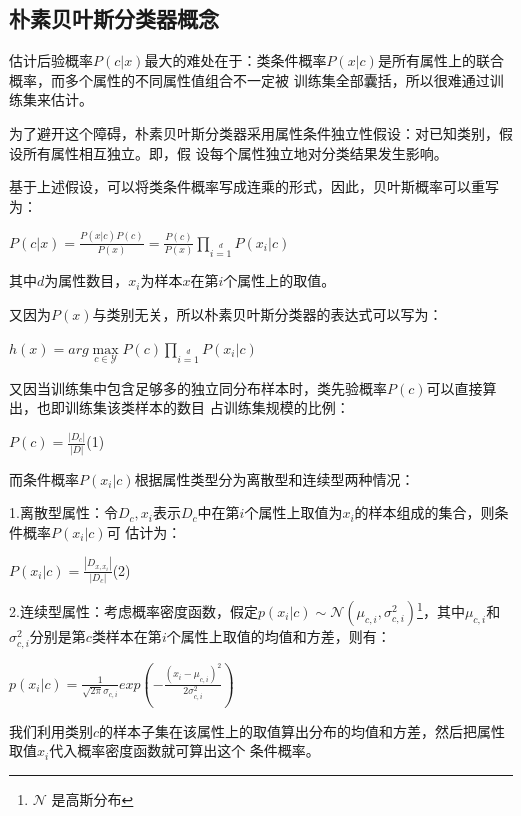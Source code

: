 \documentclass[UTF8]{ctexart}
\begin{document}
{\subsection{朴素贝叶斯分类器概念}
估计后验概率$P(c|x)$最大的难处在于：类条件概率$P(x|c)$是所有属性上的联合概率，而多个属性的不同属性值组合不一定被
训练集全部囊括，所以很难通过训练集来估计。\par
为了避开这个障碍，朴素贝叶斯分类器采用属性条件独立性假设：对已知类别，假设所有属性相互独立。即，假
设每个属性独立地对分类结果发生影响。\par
基于上述假设，可以将类条件概率写成连乘的形式，因此，贝叶斯概率可以重写为：
\begin{center}
    \LARGE{
        $P(c|x)=\frac{P(x|c)P(c)}{P(x)}=\frac{P(c)}{P(x)}\prod\limits_{i=1}\limits^dP(x_i|c)$
    }
\end{center}
其中$d$为属性数目，$x_i$为样本$x$在第$i$个属性上的取值。\par
又因为$P(x)$与类别无关，所以朴素贝叶斯分类器的表达式可以写为：
\begin{center}
    \LARGE{
        $h(x)=arg\max\limits_{c\in \mathcal Y}P(c)\prod\limits_{i=1}\limits^dP(x_i|c)$
    }
\end{center}\par
又因当训练集中包含足够多的独立同分布样本时，类先验概率$P(c)$可以直接算出，也即训练集该类样本的数目
占训练集规模的比例：
\begin{center}
    \LARGE{
        $P(c)=\frac{|D_c|}{|D|}$\quad(1)\\[2ex]
    }
\end{center}\par
而条件概率$P(x_i|c)$根据属性类型分为离散型和连续型两种情况：\par
1.离散型属性：令$D_c,x_i$表示$D_c$中在第$i$个属性上取值为$x_i$的样本组成的集合，则条件概率$P(x_i|c)$可
估计为：
\begin{center}
    \LARGE{
        $P(x_i|c)=\frac{|D_{x,x_i}|}{|D_c|}$\quad(2)\\[2ex]
    }
\end{center}\par
2.连续型属性：考虑概率密度函数，假定$p(x_i|c)\sim\mathcal N(\mu_{c,i},\sigma^2_{c,i})$\footnote{$\mathcal N$
是高斯分布}，其中$\mu_{c,i}$和$\sigma^2_{c,i}$分别是第$c$类样本在第$i$个属性上取值的均值和方差，则有：
\begin{center}
    \LARGE{
        $p(x_i|c)=\frac{1}{\sqrt{2\pi}\sigma_{c,i}}exp(-\frac{(x_i-\mu_{c,i})^2}{2\sigma^2_{c,i}})$
    }
\end{center}
我们利用类别$c$的样本子集在该属性上的取值算出分布的均值和方差，然后把属性取值$x_i$代入概率密度函数就可算出这个
条件概率。
}
\end{document}

